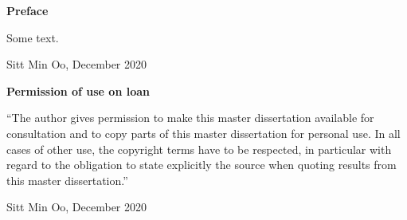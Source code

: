 
\newpage

\noindent \textbf{\huge Preface}

\vspace{1.5cm}

\noindent
Some text.

\addvspace{4cm}

\noindent Sitt Min Oo, December 2020\newpage

\noindent \textbf{\huge Permission of use on loan}

\vspace{1.5cm}

\noindent
``The author gives permission to make this master dissertation available for consultation and to copy parts
of this master dissertation for personal use. In all cases of other use, the copyright terms have to be respected,
in particular with regard to the obligation to state explicitly the source when quoting results from this master
dissertation.''

\addvspace{4cm}

\noindent Sitt Min Oo, December 2020
